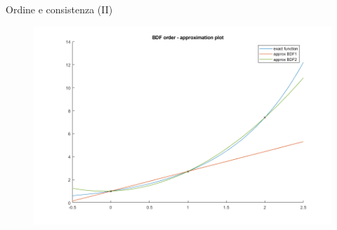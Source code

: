 \documentclass[aspectratio=169, 10pt, handout,usenames,dvipsnames]{beamer}
\begin{document}
\begin{frame}{Ordine e consistenza (II)}
        \begin{figure}
        \centering
        \includegraphics[width=.75\linewidth]{order.png}
        \label{fig:ordine_interpol}
        \end{figure}
 \end{frame}

\end{document}
